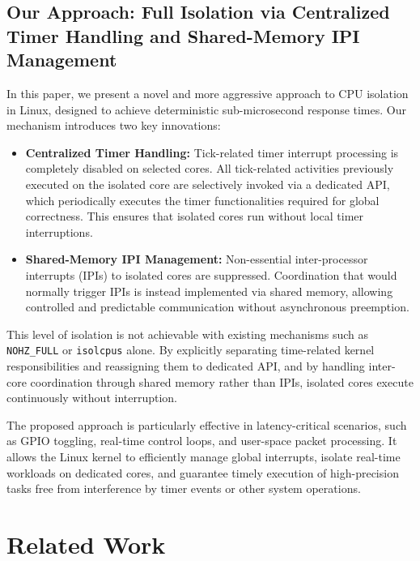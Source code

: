\documentclass[letterpaper]{article}
\begin{document}
\subsection{Our Approach: Full Isolation via Centralized Timer Handling and Shared-Memory IPI Management}

In this paper, we present a novel and more aggressive approach to CPU isolation in Linux, 
designed to achieve deterministic sub-microsecond response times. 
Our mechanism introduces two key innovations:

\begin{itemize}
    \item \textbf{Centralized Timer Handling:} Tick-related timer interrupt processing is completely disabled on selected cores. 
    All tick-related activities previously executed on the isolated core are selectively invoked via a dedicated API,
    which periodically executes the timer functionalities required for global correctness. 
    This ensures that isolated cores run without local timer interruptions.
    
    \item \textbf{Shared-Memory IPI Management:} Non-essential inter-processor interrupts (IPIs) to isolated cores 
    are suppressed. Coordination that would normally trigger IPIs is instead implemented via shared memory, 
    allowing controlled and predictable communication without asynchronous preemption.
\end{itemize}

This level of isolation is not achievable with existing mechanisms such as 
\texttt{NOHZ\_FULL} or \texttt{isolcpus} alone. 
By explicitly separating time-related kernel responsibilities and reassigning them to dedicated API, 
and by handling inter-core coordination through shared memory rather than IPIs, 
isolated cores execute continuously without interruption.  

The proposed approach is particularly effective in latency-critical scenarios, 
such as GPIO toggling, real-time control loops, and user-space packet processing. 
It allows the Linux kernel to efficiently manage global interrupts, 
isolate real-time workloads on dedicated cores, and guarantee timely execution 
of high-precision tasks free from interference by timer events or other system operations.

\section{Related Work}\label{BG}
\end{document}
